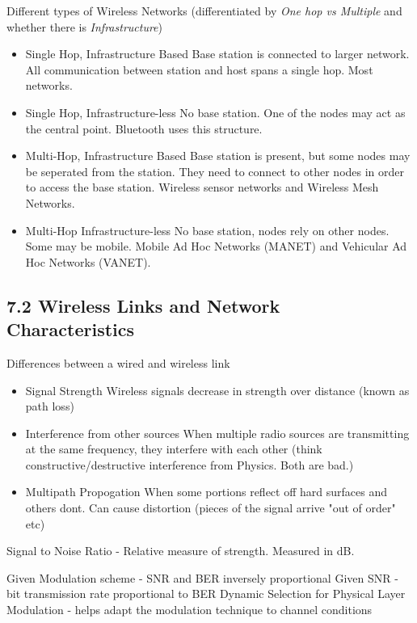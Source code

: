 \documentclass[11pt]{article}
\begin{document}
Different types of Wireless Networks (differentiated by \emph{One hop vs Multiple} and whether there is \emph{Infrastructure})
\begin{itemize}
\item Single Hop, Infrastructure Based
Base station is connected to larger network. All communication between station and host spans a single hop. Most networks.
\item Single Hop, Infrastructure-less
No base station. One of the nodes may act as the central point. Bluetooth uses this structure.
\item Multi-Hop, Infrastructure Based
Base station is present, but some nodes may be seperated from the station. They need to connect to other nodes in order to access the base station. Wireless sensor networks and Wireless Mesh Networks.
\item Multi-Hop Infrastructure-less
No base station, nodes rely on other nodes. Some may be mobile. Mobile Ad Hoc Networks (MANET) and Vehicular Ad Hoc Networks (VANET).
\end{itemize}

\subsection{7.2 Wireless Links and Network Characteristics}
\label{sec:org8a5c788}
Differences between a wired and wireless link
\begin{itemize}
\item Signal Strength
Wireless signals decrease in strength over distance (known as path loss)
\item Interference from other sources
When multiple radio sources are transmitting at the same frequency, they interfere with each other (think constructive/destructive interference from Physics. Both are bad.)

\item Multipath Propogation
When some portions reflect off hard surfaces and others dont. Can cause distortion (pieces of the signal arrive "out of order" etc)
\end{itemize}


Signal to Noise Ratio - Relative measure of strength. Measured in dB.

Given Modulation scheme - SNR and BER inversely proportional
Given SNR - bit transmission rate proportional to BER
Dynamic Selection for Physical Layer Modulation - helps adapt the modulation technique to channel conditions
\end{document}
